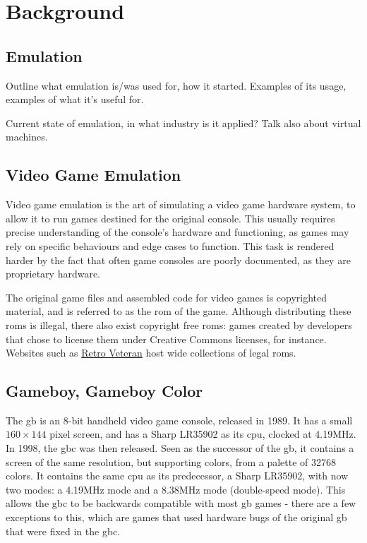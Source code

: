 \documentclass[11pt]{report}
\newcommand{\todo}[1]{\fbox{\textbf{TO-DO:} #1}}
\begin{document}
\printnoidxglossary[type=\acronymtype]
\printnoidxglossary[type=main]

\clearpage

\chapter{Background}

\section{Emulation}

\todo{}
Outline what emulation is/was used for, how it started. Examples of its usage, examples of what it's useful for.

Current state of emulation, in what industry is it applied? Talk also about virtual machines.

\section{Video Game Emulation}

Video game emulation is the art of simulating a video game hardware system, to allow it to run games destined for the original console. This usually requires precise understanding of the console's hardware and functioning, as games may rely on specific behaviours and edge cases to function. This task is rendered harder by the fact that often game consoles are poorly documented, as they are proprietary hardware.

The original game files and assembled code for video games is copyrighted material, and is referred to as the \gls{rom} of the game. Although distributing these \glspl{rom} is illegal, there also exist copyright free \glspl{rom}: games created by developers that chose to license them under Creative Commons licenses, for instance. Websites such as \href{https://www.retroveteran.com/category/nintendo-game-boy-color/}{Retro Veteran} host wide collections of legal \glspl{rom}.

\section{Gameboy, Gameboy Color}

The \gls{gb} is an 8-bit handheld video game console, released in 1989. It has a small $160 \times 144$ pixel screen, and has a Sharp LR35902 as its \gls{cpu}, clocked at 4.19MHz. In 1998, the \gls{gbc} was then released. Seen as the successor of the \gls{gb}, it contains a screen of the same resolution, but supporting colors, from a palette of 32768 colors. It contains the same \gls{cpu} as its predecessor, a Sharp LR35902, with now two modes: a 4.19MHz mode and a 8.38MHz mode (double-speed mode). This allows the \gls{gbc} to be backwards compatible with most \gls{gb} games - there are a few exceptions to this, which are games that used hardware bugs of the original \gls{gb} that were fixed in the \gls{gbc}.
\end{document}
